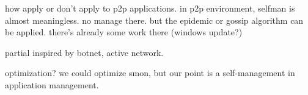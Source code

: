 
how apply or don't apply to p2p applications. in p2p
environment, selfman is almost meaningless. no manage there. but
the epidemic or gossip algorithm can be applied. there's already
some work there (windows update?)

partial inspired by botnet, active network.

optimization? we could optimize smon, but our point is a
self-management in application management.
